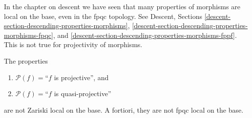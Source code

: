 \noindent
In the chapter on descent we have seen that many properties of morphisms
are local on the base, even in the fpqc topology. See
Descent, Sections \ref{descent-section-descending-properties-morphisms},
\ref{descent-section-descending-properties-morphisms-fpqc}, and
\ref{descent-section-descending-properties-morphisms-fppf}.
This is not true for projectivity of morphisms.

\begin{lemma}
\label{lemma-non-descending-property-projective}
The properties
\begin{enumerate}
\item[] $\mathcal{P}(f) =$``$f$ is projective'', and
\item[] $\mathcal{P}(f) =$``$f$ is quasi-projective''
\end{enumerate}
are not Zariski local on the base. A fortiori, they are not fpqc local
on the base.
\end{lemma}

